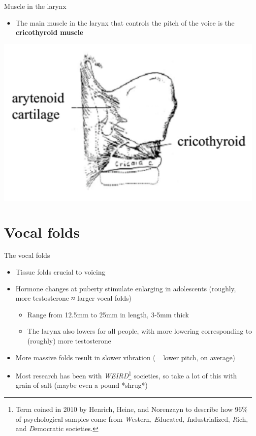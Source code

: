 \documentclass[professionalfonts]{beamer}
\begin{document}
\begin{frame}{Muscle in the larynx}
    \begin{multicols}{2}
        \begin{itemize}
            \item The main muscle in the larynx that controls the pitch of the voice is the \textbf{cricothyroid muscle}
        \end{itemize}
        \columnbreak
        \includegraphics[width = \linewidth]{figs/Cricothyroid.png}
    \end{multicols}
\end{frame}

\section*{Vocal folds}

\begin{frame}{The vocal folds}
    \begin{itemize}
        \item Tissue folds crucial to voicing
        \item Hormone changes at puberty stimulate enlarging in adolescents (roughly, more testosterone ≈ larger vocal folds)
        \begin{itemize}
            \item Range from 12.5mm to 25mm in length, 3-5mm thick
            \item The larynx also lowers for all people, with more lowering corresponding to (roughly) more testosterone
        \end{itemize}
        \item More massive folds result in slower vibration (= lower pitch, on average)
        \item Most research has been with \textit{WEIRD}\footnote{Term coined in 2010 by Henrich, Heine, and Norenzayn to describe how 96\% of psychological samples come from \textit{W}estern, \textit{E}ducated, \textit{I}ndustrialized, \textit{R}ich, and \textit{D}emocratic societies.} societies, so take a lot of this with grain of salt (maybe even a pound *shrug*)
    \end{itemize}
\end{frame}
\end{document}
